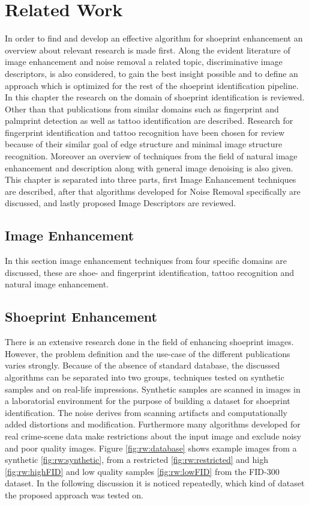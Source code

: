 \documentclass[draft,final]{vutinfth} %
\begin{document}
\chapter{Related Work}
\par
In order to find and develop an effective algorithm for shoeprint enhancement an overview about relevant research is made first.
Along the evident literature of image enhancement and noise removal a related topic, discriminative image descriptors, is also considered, to gain the best insight possible and to define an approach which is optimized for the rest of the shoeprint identification pipeline.
In this chapter the research on the domain of shoeprint identification is reviewed.
Other than that publications from similar domains such as fingerprint and palmprint detection as well as tattoo identification are described.
Research for fingerprint identification and tattoo recognition have been chosen for review because of their similar goal of edge structure and minimal image structure recognition.
Moreover an overview of techniques from the field of natural image enhancement and description along with general image denoising is also given.
This chapter is separated into three parts, first Image Enhancement techniques are described, after that algorithms developed for Noise Removal specifically are discussed, and lastly proposed Image Descriptors are reviewed.


\section{Image Enhancement}
\label{sec:rw:ImageENhancement}

In this section image enhancement techniques from four specific domains are discussed, these are shoe- and fingerprint identification, tattoo recognition and natural image enhancement.

\section*{Shoeprint Enhancement}

\par
There is an extensive research done in the field of enhancing shoeprint images.
However,  the problem definition and the use-case of the different publications varies strongly.
Because of the absence of standard database, the discussed algorithms can be separated into two groups, techniques tested on synthetic samples and on real-life impressions.
Synthetic samples are scanned in images in a laboratorial environment for the purpose of building a dataset for shoeprint identification.
The noise derives from scanning artifacts and computationally added distortions and modification.
Furthermore many algorithms developed for real crime-scene data make restrictions about the input image and exclude noisy and poor quality images.
Figure \ref{fig:rw:database} shows example images from a synthetic \ref{fig:rw:synthetic}, from a restricted \ref{fig:rw:restricted} and high \ref{fig:rw:highFID} and low quality samples \ref{fig:rw:lowFID} from the FID-300 dataset.
In the following discussion it is noticed repeatedly, which kind of dataset the proposed approach was tested on.
\end{document}
